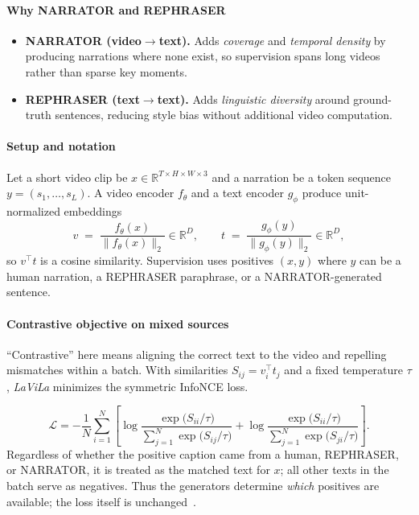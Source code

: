 \begin{enrichment}
\begin{enrichment}
        \paragraph{Why NARRATOR and REPHRASER}
        \begin{itemize}
            \item \textbf{NARRATOR (video$\to$text).} Adds \emph{coverage} and \emph{temporal density} by producing narrations where none exist, so supervision spans long videos rather than sparse key moments.
            \item \textbf{REPHRASER (text$\to$text).} Adds \emph{linguistic diversity} around ground\mbox{-}truth sentences, reducing style bias without additional video computation.
        \end{itemize}
        
        \paragraph{Setup and notation}
        Let a short video clip be $x\in\mathbb{R}^{T\times H\times W\times 3}$ and a narration be a token sequence $y=(s_1,\dots,s_L)$. A video encoder $f_\theta$ and a text encoder $g_\phi$ produce unit\mbox{-}normalized embeddings
        \[
        v \;=\; \frac{f_\theta(x)}{\lVert f_\theta(x)\rVert_2}\in\mathbb{R}^D,
        \qquad
        t \;=\; \frac{g_\phi(y)}{\lVert g_\phi(y)\rVert_2}\in\mathbb{R}^D,
        \]
        so $v^\top t$ is a cosine similarity. Supervision uses positives $(x,y)$ where $y$ can be a human narration, a REPHRASER paraphrase, or a NARRATOR\mbox{-}generated sentence.
        
        \paragraph{Contrastive objective on mixed sources}
        “Contrastive” here means aligning the correct text to the video and repelling mismatches within a batch. With similarities $S_{ij}=v_i^\top t_j$ and a fixed temperature $\tau$, \emph{LaViLa} minimizes the symmetric InfoNCE loss. 
        
        \newpage
        
        \begin{equation}
            \mathcal{L}
            = -\frac{1}{N}\sum_{i=1}^{N}
            \left[
            \log\frac{\exp\!\big(S_{ii}/\tau\big)}{\sum_{j=1}^{N}\exp\!\big(S_{ij}/\tau\big)}
            +
            \log\frac{\exp\!\big(S_{ii}/\tau\big)}{\sum_{j=1}^{N}\exp\!\big(S_{ji}/\tau\big)}
            \right].
            \label{eq:chapter24_lavila_infonce}
        \end{equation}
        Regardless of whether the positive caption came from a human, REPHRASER, or NARRATOR, it is treated as the matched text for $x$; all other texts in the batch serve as negatives. Thus the generators determine \emph{which} positives are available; the loss itself is unchanged~\cite{zhao2022_lavila}.
        

\end{enrichment}
\end{enrichment}
